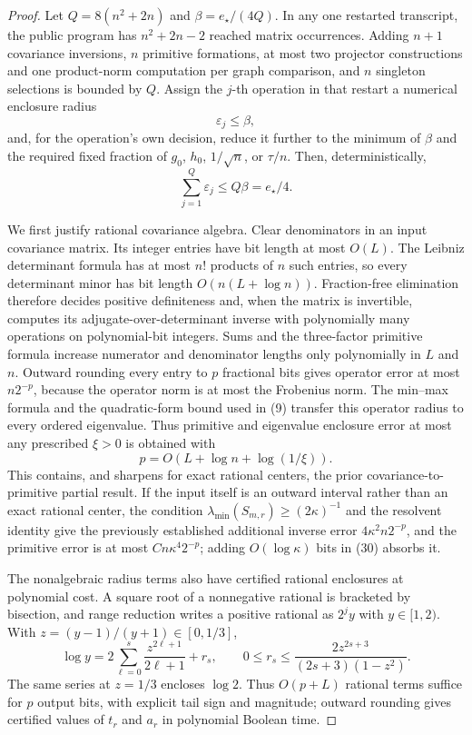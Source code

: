 \documentclass{article}
\begin{document}
\begin{proof}
Let \(Q=8(n^2+2n)\) and \(\beta=e_{\star}/(4Q)\).  In any one restarted transcript, the public program has \(n^2+2n-2\) reached matrix occurrences.  Adding \(n+1\) covariance inversions, \(n\) primitive formations, at most two projector constructions and one product-norm computation per graph comparison, and \(n\) singleton selections is bounded by \(Q\).  Assign the \(j\)-th operation in that restart a numerical enclosure radius
\[
 \varepsilon_j\le\beta,
 \tag{28}
\]
and, for the operation's own decision, reduce it further to the minimum of \(\beta\) and the required fixed fraction of \(g_0\), \(h_0\), \(1/\sqrt n\), or \(\tau/n\).  Then, deterministically,
\[
 \sum_{j=1}^{Q}\varepsilon_j\le Q\beta=e_{\star}/4.
 \tag{29}
\]

We first justify rational covariance algebra.  Clear denominators in an input covariance matrix.  Its integer entries have bit length at most \(O(L)\).  The Leibniz determinant formula has at most \(n!\) products of \(n\) such entries, so every determinant minor has bit length \(O(n(L+\log n))\).  Fraction-free elimination therefore decides positive definiteness and, when the matrix is invertible, computes its adjugate-over-determinant inverse with polynomially many operations on polynomial-bit integers.  Sums and the three-factor primitive formula increase numerator and denominator lengths only polynomially in \(L\) and \(n\).  Outward rounding every entry to \(p\) fractional bits gives operator error at most \(n2^{-p}\), because the operator norm is at most the Frobenius norm.  The min--max formula and the quadratic-form bound used in (9) transfer this operator radius to every ordered eigenvalue.  Thus primitive and eigenvalue enclosure error at most any prescribed \(\xi>0\) is obtained with
\[
 p=O\!\left(L+\log n+\log(1/\xi)\right).
 \tag{30}
\]
This contains, and sharpens for exact rational centers, the prior covariance-to-primitive partial result.  If the input itself is an outward interval rather than an exact rational center, the condition \(\lambda_{\min}(S_{m,r})\ge(2\kappa)^{-1}\) and the resolvent identity give the previously established additional inverse error \(4\kappa^2n2^{-p}\), and the primitive error is at most \(Cn\kappa^4 2^{-p}\); adding \(O(\log\kappa)\) bits in (30) absorbs it.

The nonalgebraic radius terms also have certified rational enclosures at polynomial cost.  A square root of a nonnegative rational is bracketed by bisection, and range reduction writes a positive rational as \(2^jy\) with \(y\in[1,2)\).  With \(z=(y-1)/(y+1)\in[0,1/3]\),
\[
 \log y=2\sum_{\ell=0}^{s}\frac{z^{2\ell+1}}{2\ell+1}+r_s,
 \qquad
 0\le r_s\le\frac{2z^{2s+3}}{(2s+3)(1-z^2)}.
\]
The same series at \(z=1/3\) encloses \(\log2\).  Thus \(O(p+L)\) rational terms suffice for \(p\) output bits, with explicit tail sign and magnitude; outward rounding gives certified values of \(t_r\) and \(a_r\) in polynomial Boolean time.


\end{proof}
\end{document}
